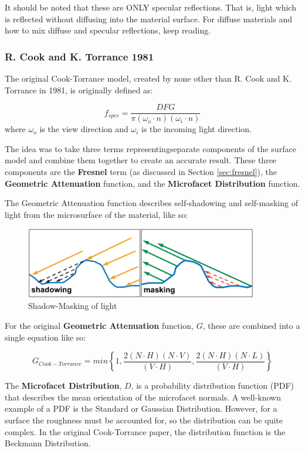 \documentclass[12pt,letterpaper]{article}
\begin{document}
It should be noted that these are ONLY specular reflections. That is, light which is reflected without diffusing into the material surface.
For diffuse materials and how to mix diffuse and specular reflections, keep reading.

\newpage

\subsubsection{R. Cook and K. Torrance 1981}

The original Cook-Torrance model, created by none other than R. Cook and K. Torrance in 1981, is originally defined as: 

$$
f_{spec} = \frac{D F G}{\pi \left( \omega_o \cdot n \right) \left( \omega_i \cdot n \right) }
$$
where $\omega_o$ is the view direction and $\omega_i$ is the incoming light direction.

The idea was to take three terms representingseparate components of the surface model and combine them 
together to create an accurate result. These three components are the \textbf{Fresnel} term (as discussed in 
Section \ref{sec:fresnel}), the \textbf{Geometric Attenuation} function, 
and the \textbf{Microfacet Distribution} function.

The Geometric Attenuation function describes self-shadowing and self-masking of light from the microsurface of the material, like so:
\begin{figure}[h]
    \centering
    \includegraphics[width=4in]{shadow-masking}
    \caption{Shadow-Masking of light}
    \label{fig:shadow_masking}
\end{figure}

For the original \textbf{Geometric Attenuation} function, $G$, these are combined into a single equation like so:

$$
G_{Cook-Torrance} = min \left\lbrace1, 
              \frac{2 \left( N \cdot H \right) \left( N \cdot V \right)}{\left( V \cdot H \right)}, 
              \frac{2 \left( N \cdot H \right) \left( N \cdot L \right)}{\left( V \cdot H \right)}
        \right\rbrace
$$

The \textbf{Microfacet Distribution}, $D$, is a probability distribution function (PDF) that describes the 
mean orientation of the microfacet normals. A well-known example of a PDF is the Standard or Gaussian Distribution.
However, for a surface the roughness must be accounted for, so the distribution can be quite complex. In the 
original Cook-Torrance paper, the distribution function is the Beckmann Distribution.
\end{document}
